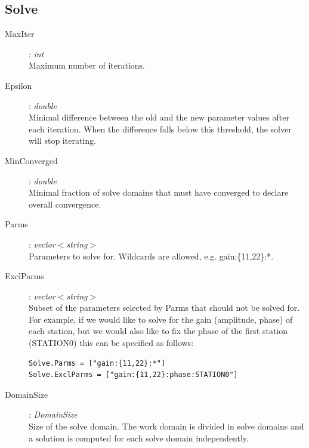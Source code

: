 \documentclass[10pt]{lofar}
\begin{document}
\subsection*{Solve}
\label{app-solve}
\begin{description}
\item [MaxIter] : \emph{int} \\
    Maximum number of iterations.
\item [Epsilon] : \emph{double} \\
    Minimal difference between the old and the new parameter values after each
    iteration. When the difference falls below this threshold, the solver will
    stop iterating.
\item [MinConverged] : \emph{double} \\
    Minimal fraction of solve domains that must have converged to declare
    overall convergence.
\item [Parms] : \emph{vector$<$string$>$} \\
    Parameters to solve for. Wildcards are allowed, e.g. gain:\{11,22\}:*.
\item [ExclParms] : \emph{vector$<$string$>$} \\
    Subset of the parameters selected by Parms that should not be solved for.
    For example, if we would like to solve for the gain (amplitude, phase) of
    each station, but we would also like to fix the phase of the first station
    (STATION0) this can be specified as follows:
{\footnotesize
\begin{verbatim}
Solve.Parms = ["gain:{11,22}:*"]
Solve.ExclParms = ["gain:{11,22}:phase:STATION0"]
\end{verbatim}
}
\item [DomainSize] : \emph{DomainSize} \\
    Size of the solve domain. The work domain is divided in solve domains and
    a solution is computed for each solve domain independently.
\end{description}
\end{document}
